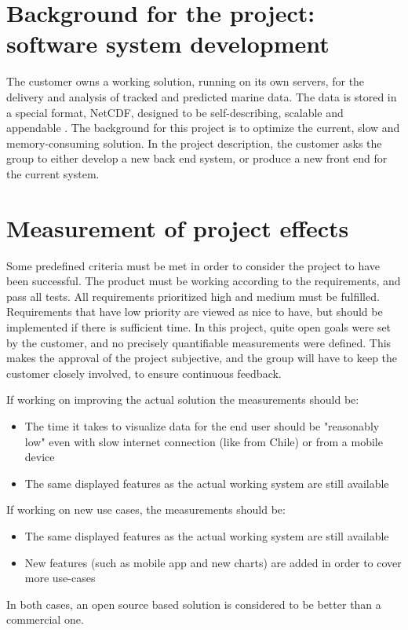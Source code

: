 \documentclass[11pt,a4paper,titlepage,oneside]{report}
\begin{document}
\section{Background for the project: software system development}
The customer owns a working solution, running on its own servers, for the delivery and analysis of  tracked and predicted marine data. The data is stored in a special format, NetCDF, designed to be self-describing, scalable and appendable \cite{netCDF:factsheet}.
The background for this project is to optimize the current, slow and memory-consuming solution. In the project description, the customer asks the group to either develop a new back end system, or produce a new front end for the current system. 

\section{Measurement of project effects}
Some predefined criteria must be met in order to consider the project to have been successful. The product must be working according to the requirements, and pass all tests. All requirements prioritized high and medium must be fulfilled. Requirements that have low priority are viewed as nice to have, but should be implemented if there is sufficient time.
In this project, quite open goals were set by the customer, and no precisely quantifiable measurements were defined. This makes the approval of the project subjective, and the group will have to keep the customer closely involved, to ensure continuous feedback.

If working on improving the actual solution the measurements should be:
\begin{itemize}
\item The time it takes to visualize data for the end user should be "reasonably low" even with slow internet connection (like from Chile) or from a mobile device
\item The same displayed features as the actual working system are still available
\end{itemize}

If working on new use cases, the measurements should be:
\begin{itemize}
\item The same displayed features as the actual working system are still available
\item New features (such as mobile app and new charts) are added in order to cover more use-cases 
\end{itemize}
In both cases, an open source based solution is considered to be better than a commercial one.
\end{document}
